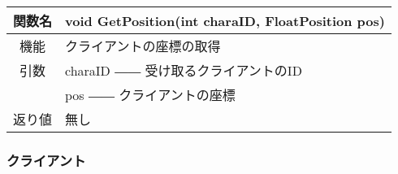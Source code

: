 \documentclass{jarticle}
\begin{document}
\begin{enumerate}
\begin{table}[H]
\begin{center}
\begin{tabular}{|c||p{30em}|}
            \end{tabular}
        \end{center}
    \end{table}
    \begin{table}[H]
        \label{table:fanc_s2-3}
        \begin{center}
            \begin{tabular}{|c||p{30em}|}\hline
                関数名&void GetPosition(int charaID, FloatPosition pos)\\\hline
                機能&クライアントの座標の取得\\
                引数&charaID ―― 受け取るクライアントのID\\
                &pos ―― クライアントの座標\\
                返り値&無し\\\hline
            \end{tabular}
        \end{center}
    \end{table}
\end{enumerate}

\subsubsection{クライアント}
\end{document}
